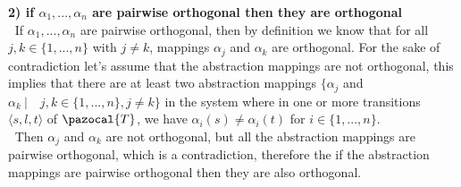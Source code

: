\documentclass[11pt,a4paper]{article}
\begin{document}
\textbf{2) if $\alpha_1, ..., \alpha_n$ are pairwise orthogonal then they are orthogonal}\\

$\>$ If $\alpha_1, ..., \alpha_n$ are pairwise orthogonal, then by 
definition we know that for all $j, k \in \{1, ... , n\}$ 
with $j \neq k$, mappings $\alpha_j$ and $\alpha_k$ are orthogonal.
For the sake of contradiction let's assume that the abstraction 
mappings are not orthogonal, this implies that there are at least 
two abstraction mappings
$\{ \alpha_j$ and $\alpha_k \ |\quad j,k \in \{1,...,n\},j \neq k \}$
 in the system where in one or more transitions
 $\langle s, l, t \rangle$ of $\pazocal{T}$, we have 
 $\alpha_i(s) \neq \alpha_i(t)$  for $i \in \{1, ... , n\}$.\\
 
 $\>$ Then $\alpha_j$ and $\alpha_k$ are not orthogonal, 
 but all the abstraction mappings are pairwise orthogonal, 
 which is a contradiction, therefore the if the abstraction mappings 
 are pairwise orthogonal then they are also orthogonal.\\
\end{document}
